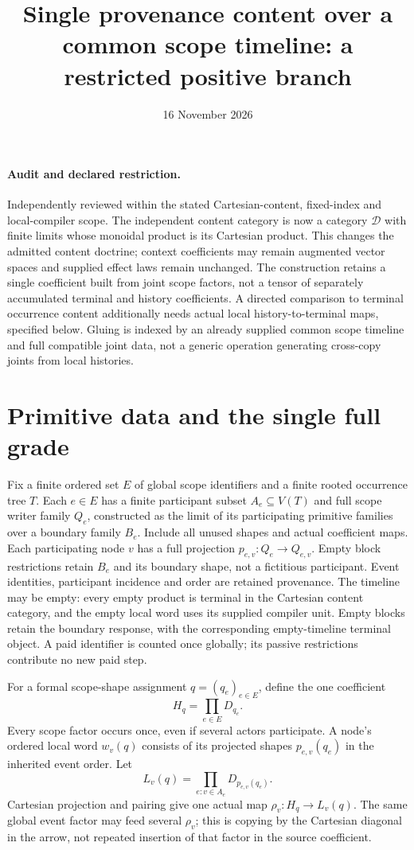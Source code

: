 \documentclass[11pt]{article}
\title{Single provenance content over a common scope timeline: a restricted positive branch}
\date{16 November 2026}
\begin{document}
\maketitle
\paragraph{Audit and declared restriction.} Independently reviewed within the stated Cartesian-content, fixed-index and local-compiler scope. The independent content category is now a category $\mathcal D$ with finite limits whose monoidal product is its Cartesian product. This changes the admitted content doctrine; context coefficients may remain augmented vector spaces and supplied effect laws remain unchanged. The construction retains a single coefficient built from joint scope factors, not a tensor of separately accumulated terminal and history coefficients. A directed comparison to terminal occurrence content additionally needs actual local history-to-terminal maps, specified below. Gluing is indexed by an already supplied common scope timeline and full compatible joint data, not a generic operation generating cross-copy joints from local histories.

\section{Primitive data and the single full grade}
Fix a finite ordered set $E$ of global scope identifiers and a finite rooted occurrence tree $T$. Each $e\in E$ has a finite participant subset $A_e\subseteq V(T)$ and full scope writer family $Q_e$, constructed as the limit of its participating primitive families over a boundary family $B_e$. Include all unused shapes and actual coefficient maps. Each participating node $v$ has a full projection $p_{e,v}:Q_e\to Q_{e,v}$. Empty block restrictions retain $B_e$ and its boundary shape, not a fictitious participant. Event identities, participant incidence and order are retained provenance. The timeline may be empty: every empty product is terminal in the Cartesian content category, and the empty local word uses its supplied compiler unit. Empty blocks retain the boundary response, with the corresponding empty-timeline terminal object. A paid identifier is counted once globally; its passive restrictions contribute no new paid step.

For a formal scope-shape assignment $q=(q_e)_{e\in E}$, define the one coefficient
\[
 H_q=\prod_{e\in E}D_{q_e}.
\]
Every scope factor occurs once, even if several actors participate. A node's ordered local word $w_v(q)$ consists of its projected shapes $p_{e,v}(q_e)$ in the inherited event order. Let
\[
 L_v(q)=\prod_{e:v\in A_e}D_{p_{e,v}(q_e)}.
\]
Cartesian projection and pairing give one actual map $\rho_v:H_q\to L_v(q)$. The same global event factor may feed several $\rho_v$; this is copying by the Cartesian diagonal in the arrow, not repeated insertion of that factor in the source coefficient.
\end{document}
